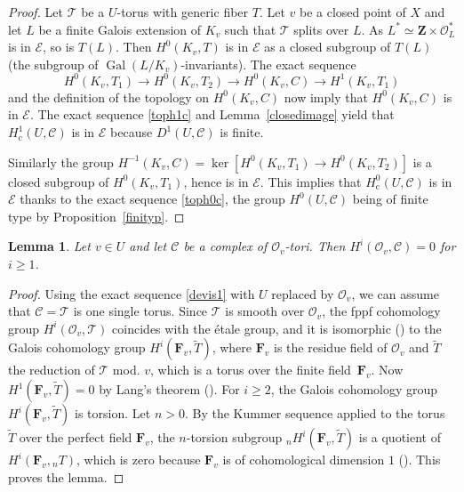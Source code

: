 \documentclass[10pt,a4paper]{amsart}
\let\mathcal\mathscr
\newcommand{\rc}{\mathrm{c}}
\theoremstyle{plain}
\newtheorem{lem}[theo]{Lemma}
\theoremstyle{definition}
\DeclareMathOperator \gal {Gal}
\newcommand \ZZ {\mathbf{Z}}
\newcommand \FF {\mathbf{F}}
\newcommand\cO {\mathcal{O}}
\newcommand \cT {\mathcal{T}}
\newcommand \cC {\mathcal{C}}
\begin{document}
\begin{proof} Let $\cT$ be a
$U$-torus with generic fiber $T$.
Let $v$ be a closed point of $X$ and let $L$ be a finite
Galois extension of $K_v$ such
that $\cT$ splits over $L$. As $L^* \simeq \ZZ \times \cO_L^*$
is in $\mathcal E$, so is $T(L)$.
Then $H^0(K_v,T)$ is in $\mathcal E$
as a closed subgroup of $T(L)$ (the subgroup
of $\gal(L/K_v)$-invariants). The exact sequence
\[
H^0(K_v,T_1) \to H^0(K_v,T_2) \to H^0(K_v,C) \to H^1(K_v,T_1)
\]
and the definition of the topology on $H^0(K_v,C)$ now imply that
$H^0(K_v,C)$ is in $\mathcal E$. The exact sequence \eqref{toph1c}
and Lemma~\ref{closedimage} yield that $H^1_\rc(U,\cC)$ is in $\mathcal E$
because $D^1(U,\cC)$ is finite.

Similarly the group $H^{-1}(K_v,C)=\ker [H^0(K_v,T_1) \to H^0(K_v,T_2)]$ is
a closed subgroup of $H^0(K_v,T_1)$, hence is in $\mathcal E$.
This implies that $H^0_\rc(U,\cC)$ is in $\mathcal E$ thanks to the exact
sequence \eqref{toph0c},
the group $H^0(U,\cC)$ being of finite type by Proposition~\ref{finityp}.
\end{proof}

\begin{lem} \label{vanishlocal}
Let $v \in U$ and let $\cC$ be a complex of $\cO_v$-tori.
Then $H^i(\cO_v, \cC)=0$ for $i \geq 1$.
\end{lem}

\begin{proof} Using the exact sequence \eqref{devis1} with $U$ replaced
by $\cO_v$, we can assume that $\mathcal C=\mathcal T$ is one single
torus. Since $\mathcal T$ is smooth over $\cO_v$, the fppf
cohomology group $H^i(\cO_v, \cT)$ coincides with the étale
group, and it is isomorphic (\cite[Prop.\,II.1.1\,(b)]{MilADT})
to the Galois cohomology group
$H^i(\FF_v,\tilde T)$, where $\FF_v$
is the residue field of $\cO_v$ and $\tilde T$ the reduction of
$\mathcal T$ mod. $v$, which is a torus over the finite field~$\FF_v$. Now $H^1(\FF_v,\tilde T)=0$ by Lang's theorem (\cite{lang}).
For $i \geq 2$, the Galois cohomology group $H^i(\FF_v,\tilde T)$ is torsion.
Let $n >0$. By the Kummer sequence applied to the torus $\tilde T$
over the perfect field $\FF_v$, the $n$-torsion
subgroup $_n H^i(\FF_v,\tilde T)$ is a quotient of $H^i(\FF_v, {}_n T)$, which
is zero because $\FF_v$ is of cohomological dimension $1$ (\cite[Chap.\,XIII, Prop.\,2]{col}). This proves the lemma.
\end{proof}
\end{document}
